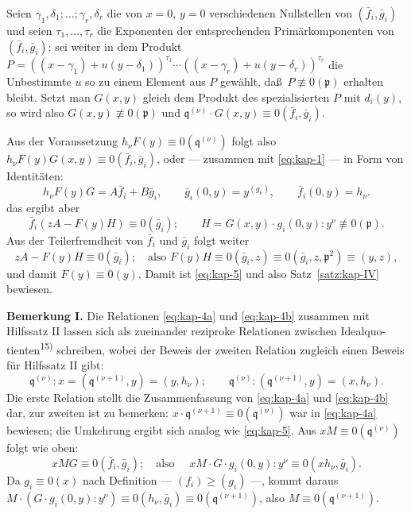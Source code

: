 \documentclass[12pt,a4paper]{article}
\theoremstyle{plain}
\theoremstyle{definition}
\theoremstyle{remark}
\begin{document}
Seien $\gamma_{1}, \delta_{1}; \ldots; \gamma_{r}, \delta_{r}$ die von $x = 0$, $y = 0$
verschiedenen Nullstellen von $(\bar{f}_{i}, \bar{g}_{i})$ und seien
$\tau_{1}, \ldots, \tau_{r}$ die Exponenten der entsprechenden
Prim\"arkomponenten von $(\bar{f}_{i}, \bar{g}_{i})$; sei weiter in dem
Produkt $P = ((x-\gamma_{1}) + u(y-\delta_{1}))^{\tau_{1}} \cdots
((x-\gamma_{r}) + u(y-\delta_{r}))^{\tau_{r}}$ die Unbestimmte $u$ so zu
einem Element aus $P$ gew\"ahlt, da\ss\ $P \not\equiv 0(\mathfrak{p})$ erhalten
bleibt. Setzt man $G(x,y)$ gleich dem Produkt des spezialisierten
$P$ mit $d_{i}(y)$, so wird also $G(x,y) \not\equiv 0(\mathfrak{p})$ und
$\mathfrak{q}^{(\nu)} \cdot G(x,y) \equiv 0(\bar{f}_{i}, \bar{g}_{i})$.

Aus der Voraussetzung $h_{\nu}F(y) \equiv 0(\mathfrak{q}^{(\nu)})$ folgt also
$h_{\nu}F(y)G(x,y) \equiv 0(\bar{f}_{i}, \bar{g}_{i})$, oder --- zusammen mit
\eqref{eq:kap-1} --- in Form von Identit\"aten:
\[
h_{\nu}F(y)G = A\bar{f}_{i} + B\bar{g}_{i}, \qquad
\bar{g}_{i}(0,y) = y^{(g_{\nu})}, \qquad
\bar{f}_{i}(0,y) = h_{\nu}.
\]
das ergibt aber
\[
\bar{f}_{i}(zA - F(y)H) \equiv 0(\bar{g}_{i}); \qquad
H = G(x,y) \cdot g_{i}(0,y) : y^{\nu} \not\equiv 0(\mathfrak{p}).
\]
Aus der Teilerfremdheit von $\bar{f}_{i}$ und $\bar{g}_{i}$ folgt weiter
\[
zA - F(y)H \equiv 0(\bar{g}_{i}); \quad \text{also } F(y)H \equiv 0(\bar{g}_{i}, z)
\equiv 0(\bar{g}_{i}, z, \mathfrak{p}^{2}) \equiv (y, z),
\]
und damit $F(y) \equiv 0(y)$. Damit ist \eqref{eq:kap-5} und also
Satz~\ref{satz:kap-IV} bewiesen.

\smallskip
\textbf{Bemerkung I.} Die Relationen \eqref{eq:kap-4a} und
\eqref{eq:kap-4b} zusammen mit Hilfssatz II lassen sich als
zueinander reziproke Relationen zwischen Idealquo-
tienten\textsuperscript{15)} schreiben, wobei der Beweis der zweiten Relation
zugleich einen Beweis f\"ur Hilfssatz II gibt:
\begin{equation}\label{eq:kap-6}
\mathfrak{q}^{(\nu)} : x = (\mathfrak{q}^{(\nu+1)}, y) = (y, h_{\nu}); \qquad
\mathfrak{q}^{(\nu)} : (\mathfrak{q}^{(\nu+1)}, y) = (x, h_{\nu}).
\end{equation}
Die erste Relation stellt die Zusammenfassung von
\eqref{eq:kap-4a} und \eqref{eq:kap-4b} dar, zur zweiten ist zu
bemerken: $x \cdot \mathfrak{q}^{(\nu+1)} \equiv 0(\mathfrak{q}^{(\nu)})$ war in
\eqref{eq:kap-4a} bewiesen; die Umkehrung ergibt sich analog wie
\eqref{eq:kap-5}. Aus $xM \equiv 0(\mathfrak{q}^{(\nu)})$ folgt wie oben:
\[
xMG \equiv 0(\bar{f}_{i}, \bar{g}_{i}); \quad \text{also }\quad
xM \cdot G \cdot g_{i}(0,y) : y^{\nu} \equiv 0(xh_{\nu}, \bar{g}_{i}).
\]
Da $g_{i} \equiv 0(x)$ nach Definition --- $(f_{i}) \geq (g_{i})$ ---,
kommt daraus $M \cdot (G \cdot g_{i}(0,y) : y^{\nu}) \equiv 0(h_{\nu}, \bar{g}_{i})
\equiv 0(\mathfrak{q}^{(\nu+1)})$, also $M \equiv 0(\mathfrak{q}^{(\nu+1)})$.
\end{document}
